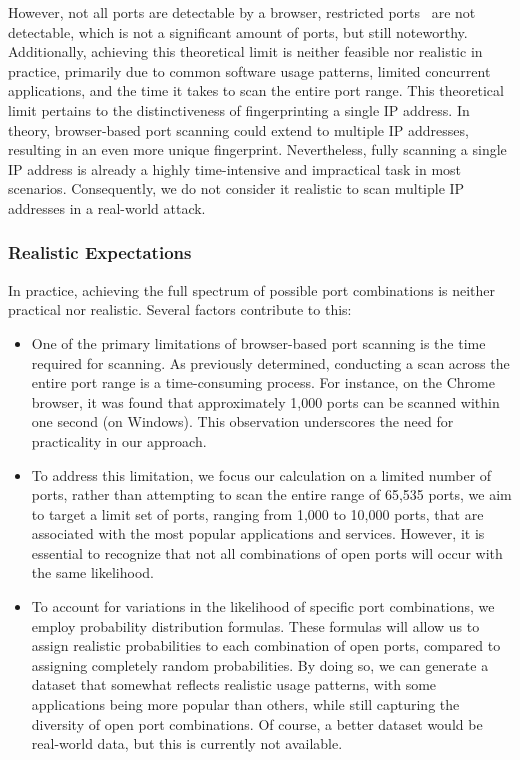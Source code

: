 However, not all ports are detectable by a browser, restricted ports~ are not detectable, which is not a significant amount of ports, but still noteworthy.
Additionally, achieving this theoretical limit is neither feasible nor realistic in practice, primarily due to common software usage patterns, limited concurrent applications, and the time it takes to scan the entire port range. 
This theoretical limit pertains to the distinctiveness of fingerprinting a single IP address. In theory, browser-based port scanning could extend to multiple IP addresses, resulting in an even more unique fingerprint. 
Nevertheless, fully scanning a single IP address is already a highly time-intensive and impractical task in most scenarios. 
Consequently, we do not consider it realistic to scan multiple IP addresses in a real-world attack.
\subsubsection{Realistic Expectations}

In practice, achieving the full spectrum of possible port combinations is neither practical nor realistic. Several factors contribute to this:

\begin{itemize}
\item One of the primary limitations of browser-based port scanning is the time required for scanning. As previously determined, conducting a scan across the entire port range is a time-consuming process. For instance, on the Chrome browser, it was found that approximately 1,000 ports can be scanned within one second (on Windows). This observation underscores the need for practicality in our approach.

\item To address this limitation, we focus our calculation on a limited number of ports, rather than attempting to scan the entire range of 65,535 ports, we aim to target a limit set of ports, ranging from 1,000 to 10,000 ports, that are associated with the most popular applications and services. However, it is essential to recognize that not all combinations of open ports will occur with the same likelihood.

\item To account for variations in the likelihood of specific port combinations, we employ probability distribution formulas. These formulas will allow us to assign realistic probabilities to each combination of open ports, compared to assigning completely random probabilities. By doing so, we can generate a dataset that somewhat reflects realistic usage patterns, with some applications being more popular than others, while still capturing the diversity of open port combinations. Of course, a better dataset would be real-world data, but this is currently not available.
\end{itemize}

